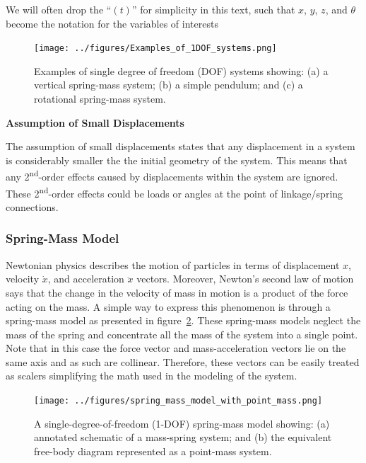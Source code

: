 \documentclass[12pt,letter]{article}
\begin{document}
		\pagebreak
		\begin{note}
			We will often drop the ``$(t)$'' for simplicity in this text, such that $x$,  $y$,  $z$, and  $\theta$ become the notation for the variables of interests
		\end{note}

		\begin{figure}[H]
			\centering
			\texttt{[image: ../figures/Examples\_of\_1DOF\_systems.png]}
			\caption{Examples of single degree of freedom (DOF) systems showing: (a) a vertical spring-mass system; (b) a simple pendulum; and (c) a rotational spring-mass system.}
			\label{fig:Examples_of_1DOF_systems}
		\end{figure}

		\begin{review}
			
			\textbf{Assumption of Small Displacements}

		\noindent The assumption of small displacements states that any displacement in a system is considerably smaller the the initial geometry of the system. This means that any 2\textsuperscript{nd}-order effects caused by displacements within the system are ignored. These 2\textsuperscript{nd}-order effects could be loads or angles at the point of linkage/spring connections. 
		\end{review}
	
		\subsubsection{Spring-Mass Model}


							
            Newtonian physics describes the motion of particles in terms of displacement $x$, velocity $\dot{x}$, and acceleration $\ddot{x}$ vectors. Moreover, Newton's second law of motion says that the change in the velocity of mass in motion is a product of the force acting on the mass. A simple way to express this phenomenon is through a spring-mass model as presented in figure~\ref{fig:spring_mass_model_with_point_mass}. These spring-mass models neglect the mass of the spring and concentrate all the mass of the system into a single point. Note that in this case the force vector and mass-acceleration vectors lie on the same axis and as such are collinear. Therefore, these vectors can be easily treated as scalers simplifying the math used in the modeling of the system.     

			\begin{figure}[H]
				\centering
				\texttt{[image: ../figures/spring\_mass\_model\_with\_point\_mass.png]}
				\caption{A single-degree-of-freedom (1-DOF) spring-mass model showing: (a) annotated schematic of a mass-spring system; and (b) the equivalent free-body diagram represented as a point-mass system.}
				\label{fig:spring_mass_model_with_point_mass}
			\end{figure}	
\end{document}

